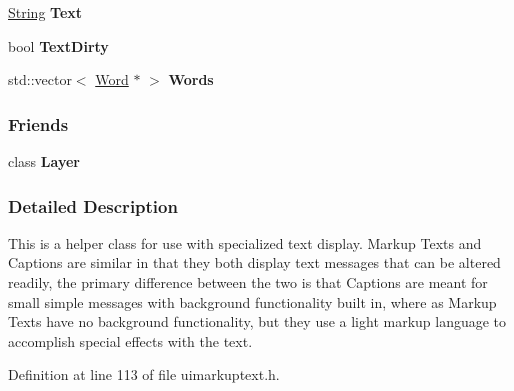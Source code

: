 \begin{DoxyCompactItemize}
\item 
\hypertarget{classMezzanine_1_1UI_1_1MarkupText_ac51f676b1c7e8061c83f8e41cf092751}{
\hyperlink{namespaceMezzanine_acf9fcc130e6ebf08e3d8491aebcf1c86}{String} {\bfseries Text}}
\label{classMezzanine_1_1UI_1_1MarkupText_ac51f676b1c7e8061c83f8e41cf092751}

\item 
\hypertarget{classMezzanine_1_1UI_1_1MarkupText_a7c4b2502d79aa03b8fbc88eb44ced75f}{
bool {\bfseries TextDirty}}
\label{classMezzanine_1_1UI_1_1MarkupText_a7c4b2502d79aa03b8fbc88eb44ced75f}

\item 
\hypertarget{classMezzanine_1_1UI_1_1MarkupText_a33d0a4f9837a7ef5ec0392be0a402eb1}{
std::vector$<$ \hyperlink{classMezzanine_1_1UI_1_1Word}{Word} $\ast$ $>$ {\bfseries Words}}
\label{classMezzanine_1_1UI_1_1MarkupText_a33d0a4f9837a7ef5ec0392be0a402eb1}

\end{DoxyCompactItemize}
\subsubsection*{Friends}
\begin{DoxyCompactItemize}
\item 
\hypertarget{classMezzanine_1_1UI_1_1MarkupText_a834e4e869446be644f61b4b456604f31}{
class {\bfseries Layer}}
\label{classMezzanine_1_1UI_1_1MarkupText_a834e4e869446be644f61b4b456604f31}

\end{DoxyCompactItemize}


\subsubsection{Detailed Description}
This is a helper class for use with specialized text display. Markup Texts and Captions are similar in that they both display text messages that can be altered readily, the primary difference between the two is that Captions are meant for small simple messages with background functionality built in, where as Markup Texts have no background functionality, but they use a light markup language to accomplish special effects with the text. 

Definition at line 113 of file uimarkuptext.h.



